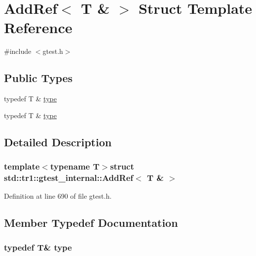 \hypertarget{structstd_1_1tr1_1_1gtest__internal_1_1AddRef_3_01T_01_6_01_4}{\section{\-Add\-Ref$<$ \-T \& $>$ \-Struct \-Template \-Reference}
\label{d7/d61/structstd_1_1tr1_1_1gtest__internal_1_1AddRef_3_01T_01_6_01_4}
}


{\ttfamily \#include $<$gtest.\-h$>$}

\subsection*{\-Public \-Types}
\begin{DoxyCompactItemize}
\item 
typedef \-T \& \hyperlink{structstd_1_1tr1_1_1gtest__internal_1_1AddRef_3_01T_01_6_01_4_a08e05528fbb401bd8299a21d67d13ee3}{type}
\item 
typedef \-T \& \hyperlink{structstd_1_1tr1_1_1gtest__internal_1_1AddRef_3_01T_01_6_01_4_a08e05528fbb401bd8299a21d67d13ee3}{type}
\end{DoxyCompactItemize}


\subsection{\-Detailed \-Description}
\subsubsection*{template$<$typename T$>$struct std\-::tr1\-::gtest\-\_\-internal\-::\-Add\-Ref$<$ T \& $>$}



\-Definition at line 690 of file gtest.\-h.



\subsection{\-Member \-Typedef \-Documentation}
\hypertarget{structstd_1_1tr1_1_1gtest__internal_1_1AddRef_3_01T_01_6_01_4_a08e05528fbb401bd8299a21d67d13ee3}{
\subsubsection[{type}]{\setlength{\rightskip}{0pt plus 5cm}typedef \-T\& {\bf type}}}\label{d7/d61/structstd_1_1tr1_1_1gtest__internal_1_1AddRef_3_01T_01_6_01_4_a08e05528fbb401bd8299a21d67d13ee3}


